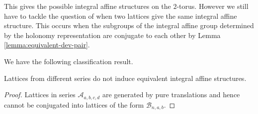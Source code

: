 This gives the possible integral affine structures on the $2$-torus. However we
still have to tackle the question of when two lattices give the same integral
affine structure. This occurs when the subgroups of the integral affine group
determined by the holonomy representation are conjugate to each other by Lemma
\ref{lemma:equivalent-dev-pair}.

We have the following classification result.
\begin{lemma}
    Lattices from different series do not induce equivalent integral affine structures.
\end{lemma}
\begin{proof}
    Lattices in series $\mathcal{A}_{a,b,c,d}$ are generated by pure translations and hence cannot be conjugated into lattices of the form $\mathcal{B}_{n,a,b}$.

\end{proof}


